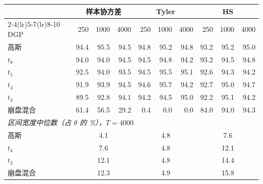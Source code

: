 \begin{tabular}{lrrrrrrrrr}
\toprule
 & \multicolumn{3}{c}{样本协方差} & \multicolumn{3}{c}{Tyler} & \multicolumn{3}{c}{HS} \\
\cmidrule(lr){2-4}\cmidrule(lr){5-7}\cmidrule(lr){8-10}
DGP & 250 & 1000 & 4000 & 250 & 1000 & 4000 & 250 & 1000 & 4000 \\
\midrule
高斯 & 94.4 & 95.5 & 94.5 & 94.8 & 95.2 & 94.8 & 93.2 & 95.2 & 95.0 \\
$t_8$ & 94.0 & 94.0 & 94.5 & 94.5 & 94.8 & 94.2 & 93.2 & 94.5 & 94.8 \\
$t_5$ & 92.5 & 94.0 & 93.5 & 94.5 & 95.5 & 95.1 & 92.6 & 94.3 & 94.2 \\
$t_4$ & 91.9 & 93.9 & 94.5 & 94.6 & 95.7 & 94.2 & 92.7 & 95.0 & 94.7 \\
$t_3$ & 89.5 & 92.8 & 94.1 & 94.2 & 94.5 & 95.0 & 92.2 & 95.1 & 94.2 \\
崩盘混合 & 61.4 & 56.5 & 29.2 & 0.4 & 0.0 & 0.0 & 84.0 & 94.0 & 94.3 \\
\midrule
\multicolumn{10}{l}{\emph{区间宽度中位数（占 $\theta$ 的 \%），$T=4000$}} \\
高斯 & \multicolumn{3}{c}{4.1} & \multicolumn{3}{c}{4.8} & \multicolumn{3}{c}{7.6} \\
$t_4$ & \multicolumn{3}{c}{7.6} & \multicolumn{3}{c}{4.8} & \multicolumn{3}{c}{12.1} \\
$t_3$ & \multicolumn{3}{c}{12.1} & \multicolumn{3}{c}{4.8} & \multicolumn{3}{c}{14.4} \\
崩盘混合 & \multicolumn{3}{c}{12.3} & \multicolumn{3}{c}{4.9} & \multicolumn{3}{c}{15.8} \\
\bottomrule
\end{tabular}